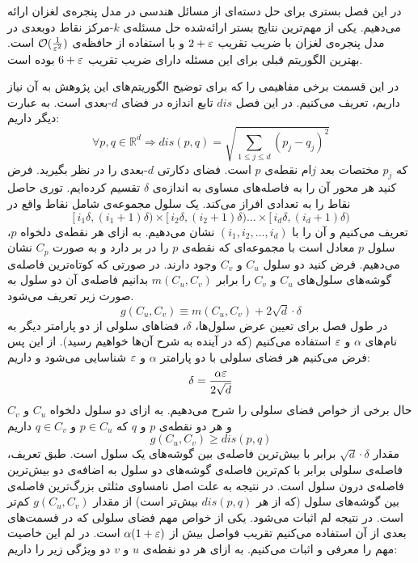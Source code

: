 


در این فصل بستری برای حل دسته‌ای از مسائل هندسی در مدل پنجره‌ی لغزان ارائه می‌دهیم. یکی از مهم‌ترین نتایج بستر ارائه‌شده حل مسئله‌ی $k$-مرکز نقاط دوبعدی در مدل پنجره‌ی لغزان با ضریب تقریب $2+\varepsilon$ و با استفاده از حافظه‌ی $\mathcal{O}(\frac{1}{\varepsilon^2})$ است. بهترین الگوریتم قبلی برای این مسئله دارای ضریب تقریب $6+\varepsilon$ بوده است.

در این قسمت برخی مفاهیمی را که برای توضیح الگوریتم‌های این پژوهش به آن نیاز داریم، تعریف می‌کنیم. در این فصل $dis$ تابع اندازه‌ در فضای $d$-بعدی است. به عبارت دیگر داریم:
$$ \forall p, q \in \mathbb{R}^d \Rightarrow dis(p,q) = \sqrt{\sum_{1 \le j \le d} (p_j-q_j)^2}   $$
که $p_j$ مختصات بعد $j$ام نقطه‌ی $p$ است.
فضای دکارتی $d$-بعدی را در نظر بگیرید. فرض کنید هر محور آن را به فاصله‌های مساوی به اندازه‌ی $\delta$ تقسیم کرده‌ایم. توری  حاصل نقاط را به تعدادی  افراز می‌کند.  یک سلول مجموعه‌ی شامل نقاط واقع در
$$ [\, i_1 \delta, (i_1+1) \delta ) \times [\, i_2 \delta, (i_2+1) \delta ) \ldots \times [\, i_d \delta, (i_d+1) \delta )  $$
تعریف می‌کنیم و آن را با $(i_1, i_2, \ldots, i_d)$ نشان می‌دهیم. به ازای هر نقطه‌ی دلخواه $p$، سلول $p$ معادل است با مجموعه‌ای که نقطه‌ی $p$ را در بر دارد و به صورت $C_p$ نشان می‌دهیم.
فرض کنید دو سلول $C_u$ و $C_v$ وجود دارند.  در صورتی که کوتاه‌ترین فاصله‌ی گوشه‌های سلول‌های $C_u$ و $C_v$ را برابر $m(C_u, C_v)$ بدانیم فاصله‌ی آن دو سلول به صورت زیر تعریف می‌شود. 
$$ g(C_u, C_v) \equiv m(C_u, C_v) + 2 \sqrt{d} \cdot \delta $$ 
در طول فصل برای تعیین عرض سلول‌ها، $\delta$، فضاهای سلولی از دو پارامتر دیگر به نام‌های $\alpha$ و $\varepsilon$ استفاده می‌کنیم (که در آینده به شرح آن‌ها خواهیم رسید). از این پس فرض می‌کنیم هر فضای سلولی با دو پارامتر $\alpha$ و $\varepsilon$ شناسایی می‌شود و داریم:
$$\delta = \frac{\alpha \varepsilon}{2 \sqrt{d}}$$
حال برخی از خواص فضای سلولی را شرح می‌دهیم.
به ازای دو سلول دلخواه $C_u$ و  $C_v$ و هر دو نقطه‌ی $p$ و $q$ که 
$p \in C_u$  و $q \in C_v$
داریم
$$ g(C_u, C_v) \ge dis(p, q)$$
مقدار $\sqrt{d} \cdot \delta $ برابر با بیش‌ترین فاصله‌ی بین گوشه‌های یک سلول است. طبق تعریف، فاصله‌ی سلولی برابر با کم‌ترین فاصله‌ی گوشه‌های دو سلول‌ به اضافه‌ی دو بیش‌ترین فاصله‌ی درون سلول است. در نتیجه به علت اصل نامساوی مثلثی بزرگ‌ترین فاصله‌ی بین گوشه‌های سلول (که از هر $dis(p,q)$ بیش‌تر است) از مقدار $g(C_u, C_v)$ کم‌تر است. در نتیجه لم اثبات می‌شود.
یکی از خواص مهم فضای سلولی که در قسمت‌های بعدی از آن استفاده می‌کنیم تقریب فواصل بیش از $\alpha (1 + \varepsilon)$ است. در لم  این خاصیت مهم را معرفی و اثبات می‌کنیم.
به ازای هر دو نقطه‌ی $u$ و $v$ دو ویژگی زیر را داریم:

